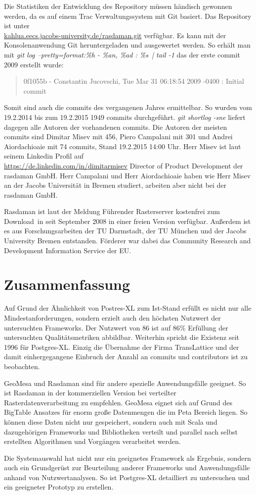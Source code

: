 Die Statistiken der Entwicklung des Repository müssen händisch gewonnen werden, da es auf einem Trac Verwaltungssystem mit Git basiert.
Das Repository ist unter\\\url{kahlua.eecs.jacobs-university.de/rasdaman.git} verfügbar.
Es kann mit der Konsolenanwendung Git heruntergeladen und ausgewertet werden.
So erhält man mit \textit{git log --pretty=format:\grqq \%h - \%an, \%ad : \%s\grqq\ | tail -1} das der erste commit 2009 erstellt wurde:
\begin{quote}
0f1055b - Constantin Jucovschi, Tue Mar 31 06:18:54 2009 -0400 : Initial commit
\end{quote}
Somit sind auch die commits des vergangenen Jahres ermittelbar.
So wurden vom 19.2.2014 bis zum 19.2.2015 1949 commits durchgeführt.
\textit{git shortlog -sne} liefert dagegen alle Autoren der vorhandenen commits.
Die Autoren der meisten commits sind Dimitar Misev mit 456, Piero Campalani mit 301 und Andrei Aiordachioaie mit 74 commits, Stand 19.2.2015 14:00 Uhr.
Herr Misev ist laut seinem Linkedin Profil auf\\\url{https://de.linkedin.com/in/dimitarmisev} Director of Product Development der \mbox{rasdaman} GmbH.
Herr Campalani und Herr Aiordachioaie haben wie Herr Misev an der Jacobs Universität in Bremen studiert, arbeiten aber nicht bei der \mbox{rasdaman} GmbH.

Rasdaman ist laut der Meldung \glqq Führender Rasterserver kostenfrei zum Download\grqq\ in \cite{website:rasdaman-newsarchive} seit September 2008 in einer freien Version verfügbar.
Außerdem ist es aus Forschungsarbeiten der TU Darmstadt, der TU München und der Jacobs University Bremen entstanden.
Förderer war dabei das Community Research and Development Information Service der EU. \cite{website:rasdaman-cordis}

\section{Zusammenfassung}
Auf Grund der Ähnlichkeit von Postres-XL zum Ist-Stand erfüllt es nicht nur alle Mindestanforderungen, sondern erzielt auch den höchsten Nutzwert der untersuchten Frameworks.
Der Nutzwert von 86 ist auf 86\% Erfüllung der untersuchten Qualitätsmetriken abbildbar.
Weiterhin spricht die Existenz seit 1996 für Postgres-XL.
Einzig die Übernahme der Firma TransLattice und der damit einhergegangene Einbruch der Anzahl an commits und contributors ist zu beobachten.

GeoMesa und Rasdaman sind für andere spezielle Anwendungsfälle geeignet.
So ist Rasdaman in der kommerziellen Version bei verteilter Rasterdatenverarbeitung zu empfehlen.
GeoMesa eignet sich auf Grund des BigTable Ansatzes für enorm große Datenmengen die im Peta Bereich liegen.
So können diese Daten nicht nur gespeichert, sondern auch mit Scala und dazugehörigen Frameworks und Bibliotheken verteilt und parallel nach selbst erstellten Algorithmen und Vorgängen verarbeitet werden.

Die Systemauswahl hat nicht nur ein geeignetes Framework als Ergebnis, sondern auch ein Grundgerüst zur Beurteilung anderer Frameworks und Anwendungsfälle anhand von Nutzwertanalysen.
So ist Postgres-XL detailliert zu untersuchen und ein geeigneter Prototyp zu erstellen.